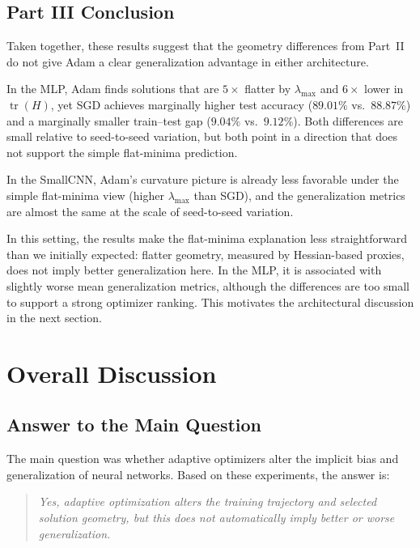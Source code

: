 \documentclass[11pt]{article}
\begin{document}
\subsection{Part III Conclusion}

Taken together, these results suggest that the geometry differences from Part~II do not give Adam a clear generalization advantage in either architecture.

In the MLP, Adam finds solutions that are $5\times$ flatter by $\lambda_{\max}$ and $6\times$ lower in $\operatorname{tr}(H)$, yet SGD
achieves marginally higher test accuracy ($89.01\%$ vs.\ $88.87\%$) and a marginally smaller train--test gap ($9.04\%$ vs.\ $9.12\%$).
Both differences are small relative to seed-to-seed variation, but both point in a direction that does not support the simple flat-minima prediction.

In the SmallCNN, Adam's curvature picture is already less favorable under the simple flat-minima view (higher $\lambda_{\max}$ than SGD), and the generalization metrics are almost the same at the scale of seed-to-seed variation.

In this setting, the results make the flat-minima explanation less straightforward than we initially expected: flatter geometry, measured by Hessian-based proxies, does not imply better generalization here. In the MLP, it is associated with slightly worse mean generalization metrics, although the differences are too small to support a strong optimizer ranking. This motivates the architectural discussion in the next section.

\FloatBarrier



\section{Overall Discussion}

\subsection{Answer to the Main Question}

The main question was whether adaptive optimizers alter the implicit bias and generalization of neural networks. Based on these experiments, the answer is:
\begin{quote}
\emph{Yes, adaptive optimization alters the training trajectory and selected solution geometry, but this does not automatically imply better or worse generalization.}
\end{quote}
\end{document}
